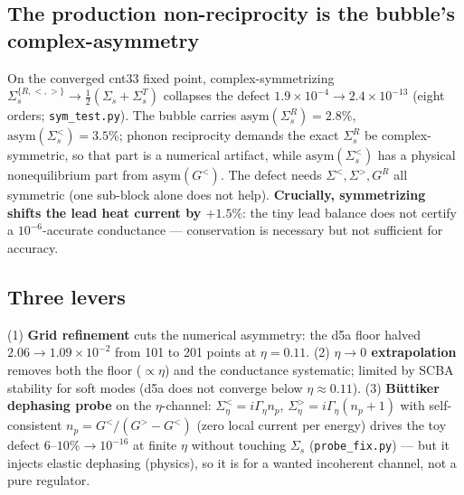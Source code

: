 \documentclass[11pt]{article}
\begin{document}
\subsection{The production non-reciprocity is the bubble's complex-asymmetry}
On the converged cnt33 fixed point, complex-symmetrizing
$\Sigma_s^{\{R,<,>\}}\to\tfrac12(\Sigma_s+\Sigma_s^T)$ collapses the defect
$1.9\times10^{-4}\to2.4\times10^{-13}$ (eight orders; \texttt{sym\_test.py}).
The bubble carries $\mathrm{asym}(\Sigma_s^R)=2.8\%$,
$\mathrm{asym}(\Sigma_s^<)=3.5\%$; phonon reciprocity demands the exact
$\Sigma_s^R$ be complex-symmetric, so that part is a numerical artifact, while
$\mathrm{asym}(\Sigma_s^<)$ has a physical nonequilibrium part from
$\mathrm{asym}(G^<)$. The defect needs $\Sigma^<,\Sigma^>,G^R$ all symmetric
(one sub-block alone does not help). \textbf{Crucially, symmetrizing shifts the
lead heat current by $+1.5\%$}: the tiny lead balance does not certify a
$10^{-6}$-accurate conductance --- conservation is necessary but not
sufficient for accuracy.

\subsection{Three levers}
(1) \textbf{Grid refinement} cuts the numerical asymmetry: the d5a floor
halved $2.06\to1.09\times10^{-2}$ from 101 to 201 points at $\eta=0.11$.
(2) \textbf{$\eta\to0$ extrapolation} removes both the floor ($\propto\eta$)
and the conductance systematic; limited by SCBA stability for soft modes (d5a
does not converge below $\eta\approx0.11$). (3) \textbf{B\"uttiker dephasing
probe} on the $\eta$-channel: $\Sigma_\eta^<=i\Gamma_\eta n_p$,
$\Sigma_\eta^>=i\Gamma_\eta(n_p+1)$ with self-consistent
$n_p=G^</(G^>-G^<)$ (zero local current per energy) drives the toy defect
$6$--$10\%\to10^{-16}$ at finite $\eta$ without touching $\Sigma_s$
(\texttt{probe\_fix.py}) --- but it injects elastic dephasing (physics), so it
is for a wanted incoherent channel, not a pure regulator.
\end{document}
